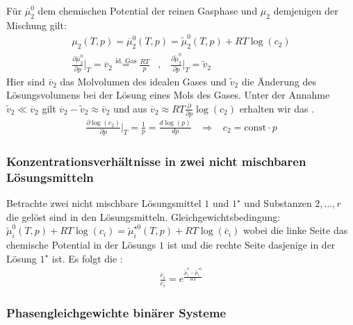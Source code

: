 Für $\overline{\mu}_2^0$ dem chemischen Potential der reinen Gasphase und $\mu_2$
demjenigen der Mischung gilt:
\begin{align*}
    \mu_2 (T,p) = \overline{\mu}_2^0 (T,p) = \tilde{\mu}_2^0 (T,p) + R T \log(c_2)
    \\
    \frac{\partial \overline{\mu}_2^0}{\partial p} \Big|_T = \overline{v}_2
    \stackrel{\text{id. Gas}}{=} \frac{R T}{p}
    \hspace{10pt} , \hspace{10pt}
    \frac{\partial \tilde{\mu}_2^0}{\partial p} \Big|_T = \tilde{v}_2
\end{align*}
Hier sind $\overline{v}_2$ das Molvolumen des idealen Gases und $\tilde{v}_2$ die
Änderung des Lösungsvolumens bei der Lösung eines Mols des Gases. Unter der Annahme
$\tilde{v}_2 \ll \overline{v}_2$ gilt $\overline{v}_2 - \tilde{v}_2 \approx \overline{v}_2$
und aus $\overline{v}_2 \approx R T \frac{\partial}{\partial p} \log(c_2)$ erhalten
wir das .
\begin{align*}
    \frac{\partial \log(c_2)}{\partial p} \Big|_T = \frac{1}{p} = \frac{d \log(p)}{dp}
    \hspace{10pt} \Rightarrow \hspace{10pt}
    c_2 = \text{const} \cdot p
\end{align*}

\vspace{-10pt}

\subsubsection{Konzentrationsverhältnisse in zwei nicht mischbaren Lösungsmitteln}

Betrachte zwei nicht mischbare Lösungsmittel $1$ und $1^\star$ und Substanzen
$2,\dots,r$ die gelöst sind in den Lösungsmitteln. Gleichgewichtsbedingung:
$\tilde{\mu}_i^0 (T,p) + R T \log(c_i) = \tilde{\mu}_i^{\star 0} (T,p) + R T \log(\overline{c}_i)$
wobei die linke Seite das chemische Potential in der Lösungs $1$ ist und die rechte
Seite dasjenige in der Lösung $1^\star$ ist. Es folgt die :
\begin{align*}
    \frac{\overline{c}_i}{c_i} = e^{\frac{\tilde{\mu}_i^0 - \tilde{\mu}_i^{\star 0}}{R T}}
\end{align*}

\subsubsection{Phasengleichgewichte binärer Systeme}

